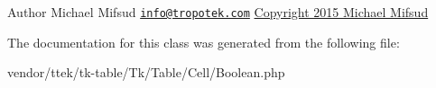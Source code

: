 \begin{DoxyAuthor}{Author}
Michael Mifsud \href{mailto:info@tropotek.com}{\tt info@tropotek.\+com} \hyperlink{}{Copyright 2015 Michael Mifsud }
\end{DoxyAuthor}


The documentation for this class was generated from the following file\+:\begin{DoxyCompactItemize}
\item 
vendor/ttek/tk-\/table/\+Tk/\+Table/\+Cell/Boolean.\+php\end{DoxyCompactItemize}
